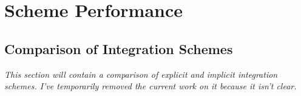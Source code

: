 \documentclass[10pt,a4paper,titlepage]{report}
\begin{document}
\section{Scheme Performance}
\subsection{Comparison of Integration Schemes}
\textit{This section will contain a comparison of explicit and implicit integration schemes. I've temporarily removed the current work on it because it isn't clear.}
\end{document}
